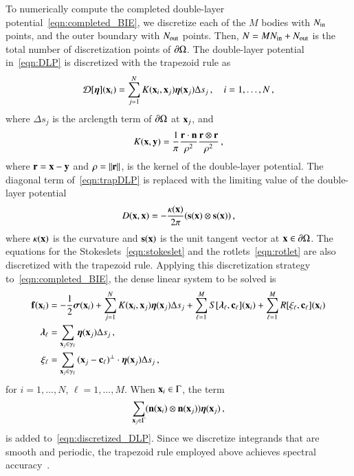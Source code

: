 \documentclass[preprint, 10pt]{elsarticle}
\begin{document}
To numerically compute the completed double-layer potential~\eqref{eqn:completed_BIE}, we discretize each of the $M$ bodies with  $N_{\mathrm{in}}$ points, and the outer boundary with $N_{\mathrm{out}}$ points.  Then, $N = MN_{\mathrm{in}} + N_{\mathrm{out}}$ is the total number of discretization points of ${\partial}\Omega$.  The double-layer potential in~\eqref{eqn:DLP} is discretized with the trapezoid rule as
\begin{align}
  {\mathcal{D}}[{\boldsymbol\eta}]({\mathbf{x}}_i) = \sum_{j=1}^{N} K({\mathbf{x}}_i,{\mathbf{x}}_j) {\boldsymbol\eta}({\mathbf{x}}_j) 
      \Delta s_{j}\, , \quad i=1,\ldots,N \, ,
  \label{eqn:trapDLP}
\end{align}
where $\Delta s_j$ is the arclength term of ${\partial}\Omega$ at
${\mathbf{x}}_j$, and
\begin{align}
  K({\mathbf{x}},{\mathbf{y}}) = \frac{1}{\pi} \frac{{\mathbf{r}} \cdot {\mathbf{n}}}{\rho^2} 
      \frac{{\mathbf{r}} \otimes {\mathbf{r}}}{\rho^2} \, ,
\end{align}
where ${\mathbf{r}} = {\mathbf{x}} - {\mathbf{y}}$ and $\rho = \|{\mathbf{r}}\|$, is the kernel of the double-layer potential.  The diagonal term of~\eqref{eqn:trapDLP} is replaced with the limiting value of the double-layer potential
\begin{align}
  D({\mathbf{x}},{\mathbf{x}}) = -\frac{\kappa({\mathbf{x}})}{2\pi}({\mathbf{s}}({\mathbf{x}}) \otimes {\mathbf{s}}({\mathbf{x}})) \, ,
\end{align}
where $\kappa({\mathbf{x}})$ is the curvature and ${\mathbf{s}}({\mathbf{x}})$ is the unit tangent vector at ${\mathbf{x}} \in {\partial}\Omega$.  The equations for the Stokeslets~\eqref{eqn:stokeslet} and the rotlets~\eqref{eqn:rotlet} are also discretized with the trapezoid rule.  Applying this discretization strategy to~\eqref{eqn:completed_BIE}, the dense linear system to be solved is
\begin{subequations}
  \label{eqn:completed_BIE_discretized}
  \begin{align}
  \label{eqn:discretized_DLP}
    {\mathbf{f}}({\mathbf{x}}_i) &= -\frac{1}{2}{\boldsymbol\sigma}({\mathbf{x}}_i) + \sum_{j=1}^{N} 
      K({\mathbf{x}}_i,{\mathbf{x}}_j) {\boldsymbol\eta}({\mathbf{x}}_j) \Delta s_{j} + 
      \sum_{\ell=1}^M S[{\boldsymbol\lambda}_\ell,{\mathbf{c}}_\ell]({\mathbf{x}}_i) +
      \sum_{\ell=1}^M R[\xi_\ell,{\mathbf{c}}_\ell]({\mathbf{x}}_i) \\
    {\boldsymbol\lambda}_\ell &= \sum_{{\mathbf{x}}_j \in \gamma_\ell} {\boldsymbol\eta}({\mathbf{x}}_j) 
      \Delta s_j \, , \\ 
    \xi_\ell &= \sum_{{\mathbf{x}}_j \in \gamma_\ell}
      {({\mathbf{x}}_j - {\mathbf{c}}_\ell)}^\perp \cdot {\boldsymbol\eta}({\mathbf{x}}_j) \Delta s_j \, ,
  \end{align}
\end{subequations}
for $i=1,\ldots,N$, $\ell=1,\ldots,M$.  When ${\mathbf{x}}_i \in \Gamma$, the term 
\begin{align}
  \sum_{{\mathbf{x}}_j \in \Gamma} ({\mathbf{n}}({\mathbf{x}}_i) \otimes
      {\mathbf{n}}({\mathbf{x}}_j)){\boldsymbol\eta}({\mathbf{x}}_j) \, ,
\end{align}
is added to~\eqref{eqn:discretized_DLP}.  Since we discretize integrands that are smooth and periodic, the trapezoid rule employed above achieves spectral accuracy~\cite{tre-wei2014}.  
\end{document}
